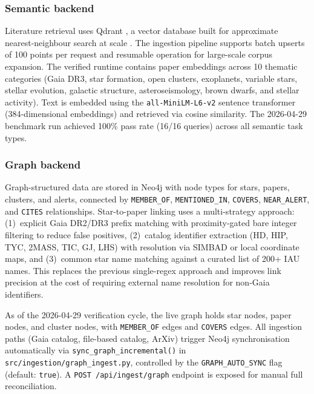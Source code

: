 \documentclass[12pt]{elsarticle}
\begin{document}
\subsubsection{Semantic backend}
Literature retrieval uses Qdrant \citep{Qdrant2023}, a vector database built for approximate nearest-neighbour search at scale \citep{Malkov2020}. The ingestion pipeline supports batch upserts of 100 points per request and resumable operation for large-scale corpus expansion. The verified runtime contains \nPapersQdrant{} paper embeddings across 10 thematic categories (Gaia DR3, star formation, open clusters, exoplanets, variable stars, stellar evolution, galactic structure, asteroseismology, brown dwarfs, and stellar activity). Text is embedded using the \texttt{all-MiniLM-L6-v2} sentence transformer \citep{Reimers2019, Wang2020MiniLM} (384-dimensional embeddings) and retrieved via cosine similarity. The 2026-04-29 benchmark run achieved 100\% pass rate (16/16 queries) across all semantic task types.

\subsubsection{Graph backend}
Graph-structured data are stored in Neo4j \citep{Robinson2015} with node types for stars, papers, clusters, and alerts, connected by \texttt{MEMBER\_OF}, \texttt{MENTIONED\_IN}, \texttt{COVERS}, \texttt{NEAR\_ALERT}, and \texttt{CITES} relationships. Star-to-paper linking uses a multi-strategy approach: (1)~explicit Gaia DR2/DR3 prefix matching with proximity-gated bare integer filtering to reduce false positives, (2)~catalog identifier extraction (HD, HIP, TYC, 2MASS, TIC, GJ, LHS) with resolution via SIMBAD or local coordinate maps, and (3)~common star name matching against a curated list of 200+ IAU names. This replaces the previous single-regex approach and improves link precision at the cost of requiring external name resolution for non-Gaia identifiers.

As of the 2026-04-29 verification cycle, the live graph holds \textbf{\nStarNodes{}} star nodes, \textbf{\nPaperNodes{}} paper nodes, and \textbf{\nClusterNodes{}} cluster nodes, with \textbf{\nMemberOfEdges{}} \texttt{MEMBER\_OF} edges and \textbf{\nCoversEdges{}} \texttt{COVERS} edges. All ingestion paths (Gaia catalog, file-based catalog, ArXiv) trigger Neo4j synchronisation automatically via \texttt{sync\_graph\_incremental()} in \texttt{src/ingestion/graph\_ingest.py}, controlled by the \texttt{GRAPH\_AUTO\_SYNC} flag (default: \texttt{true}). A \texttt{POST /api/ingest/graph} endpoint is exposed for manual full reconciliation.
\end{document}
